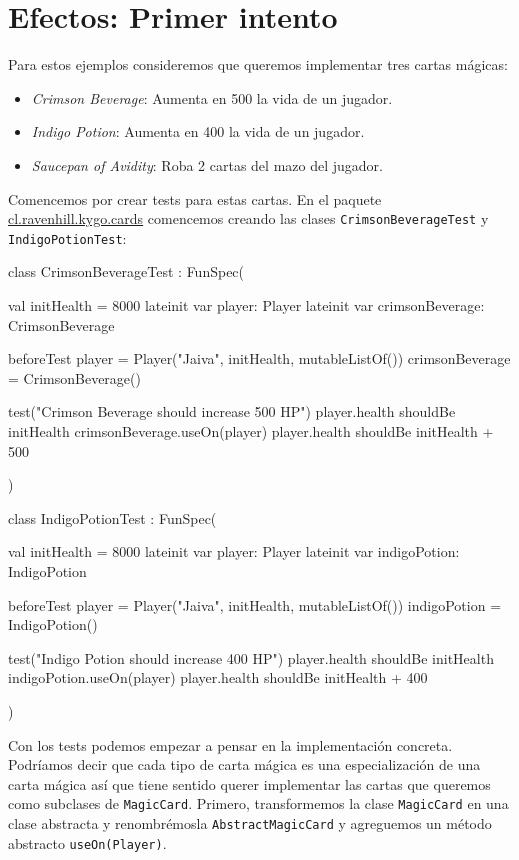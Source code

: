 \section{Efectos: Primer intento}
  \label{sec:oop:strategy:effect:1}

  Para estos ejemplos consideremos que queremos implementar tres cartas mágicas:

  \begin{itemize}
    \item \textit{Crimson Beverage}: Aumenta en 500 la vida de un jugador.
    \item \textit{Indigo Potion}: Aumenta en 400 la vida de un jugador.
    \item \textit{Saucepan of Avidity}: Roba 2 cartas del mazo del jugador.
  \end{itemize}

  Comencemos por crear tests para estas cartas.
  En el paquete \url{cl.ravenhill.kygo.cards} comencemos creando las clases 
  \texttt{CrimsonBeverageTest} y \texttt{IndigoPotionTest}:

  \begin{kotlin}
    class CrimsonBeverageTest : FunSpec({
      val initHealth = 8000
      lateinit var player: Player
      lateinit var crimsonBeverage: CrimsonBeverage

      beforeTest {
        player = Player("Jaiva", initHealth, mutableListOf())
        crimsonBeverage = CrimsonBeverage()
      }

      test("Crimson Beverage should increase 500 HP") {
        player.health shouldBe initHealth
        crimsonBeverage.useOn(player)
        player.health shouldBe initHealth + 500
      }
    })
  \end{kotlin}

  \begin{kotlin}
    class IndigoPotionTest : FunSpec({
      val initHealth = 8000
      lateinit var player: Player
      lateinit var indigoPotion: IndigoPotion

      beforeTest {
        player = Player("Jaiva", initHealth, mutableListOf())
        indigoPotion = IndigoPotion()
      }

      test("Indigo Potion should increase 400 HP") {
        player.health shouldBe initHealth
        indigoPotion.useOn(player)
        player.health shouldBe initHealth + 400
      }
    })
  \end{kotlin}

  Con los tests podemos empezar a pensar en la implementación concreta.
  Podríamos decir que cada tipo de carta mágica es una especialización de una carta mágica así que
  tiene sentido querer implementar las cartas que queremos como subclases de \texttt{MagicCard}.
  Primero, transformemos la clase \texttt{MagicCard} en una clase abstracta y renombrémosla
  \texttt{AbstractMagicCard} y agreguemos un método abstracto \texttt{useOn(Player)}.

